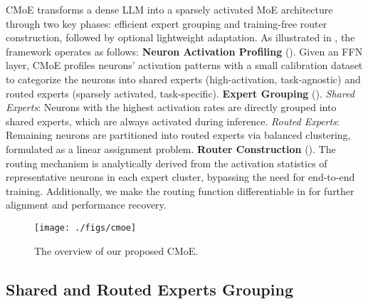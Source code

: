 CMoE transforms a dense LLM into a sparsely activated MoE architecture through two key phases: efficient expert grouping and training-free router construction, followed by optional lightweight adaptation.
As illustrated in , the framework operates as follows:
     \textbf{Neuron Activation Profiling} ().
    Given an FFN layer, CMoE profiles neurons' activation patterns with a small calibration dataset to categorize the neurons into shared experts (high-activation, task-agnostic) and routed experts (sparsely activated, task-specific).
     \textbf{Expert Grouping} ().
    \textit{Shared Experts}: Neurons with the highest activation rates are directly grouped into shared experts, which are always activated during inference. 
    \textit{Routed Experts}: Remaining neurons are partitioned into routed experts via balanced clustering, formulated as a linear assignment problem.
     \textbf{Router Construction} ().
    The routing mechanism is analytically derived from the activation statistics of representative neurons in each expert cluster, bypassing the need for end-to-end training.
Additionally, we make the routing function differentiable in  for further alignment and performance recovery.

\begin{figure}[t!]
    \centering
    \texttt{[image: ./figs/cmoe]}\vspace{-2mm}
    \caption{
    The overview of our proposed CMoE.
    }
    \label{fig:cmoe}\vspace{2mm}
\end{figure}

\iffalse
By reusing the dense model’s parameters and activation patterns, 
CMoE achieves parameter preservation without retraining and dynamic sparsity, making it both efficient and practical for deployment.
\fi


\subsection{Shared and Routed Experts Grouping}
\label{sec:expert_cons}

